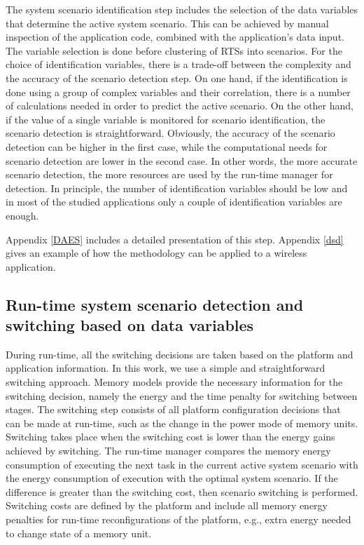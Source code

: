 The system scenario identification step includes the selection of the data variables that determine the active system scenario. 
This can be achieved by manual inspection of the application code, combined with the application's data input.
The variable selection is done before clustering of RTSs into scenarios.
For the choice of identification variables, there is a trade-off between the complexity and the accuracy of the scenario detection step.
On one hand, if the identification is done using a group of complex variables and their correlation, there is a number of calculations needed in order to predict the active scenario. 
On the other hand, if the value of a single variable is monitored for scenario identification, the scenario detection is straightforward.
Obviously, the accuracy of the scenario detection can be higher in the first case, while the computational needs for scenario detection are lower in the second case.
In other words, the more accurate scenario detection, the more resources are used by the run-time manager for detection.
In principle, the number of identification variables should be low and in most of the studied applications only a couple of identification variables are enough. 

Appendix \ref{DAES} includes a detailed presentation of this step. Appendix \ref{dsd} gives an example of how the methodology can be applied to a wireless application.

\subsection{Run-time system scenario detection and switching based on data variables}

During run-time, all the switching decisions are taken based on the platform and application information. 
In this work, we use a simple and straightforward switching approach.
Memory models provide the necessary information for the switching decision, namely the energy and the time penalty for switching between stages.
The switching step consists of all platform configuration decisions that can be made at run-time, such as the change in the power mode of memory units.
Switching takes place when the switching cost is lower than the energy gains achieved by switching. 
The run-time manager compares the memory energy consumption of executing the next task in the current active system scenario with the energy consumption of execution with the optimal system scenario. 
If the difference is greater than the switching cost, then scenario switching is performed.
Switching costs are defined by the platform and include all memory energy penalties for run-time reconfigurations of the platform, e.g., extra energy needed to change state of a memory unit.

